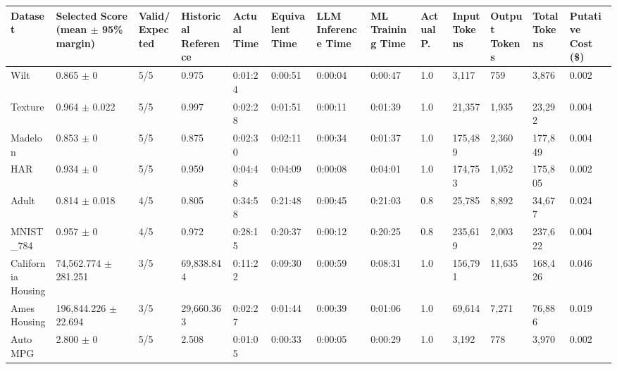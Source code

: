 \begin{tabular}{lllllllllllll}
\hline
Dataset & Selected Score (mean \ensuremath{\pm} 95\% margin) & Valid/Expected & Historical Reference & Actual Time & Equivalent Time & LLM Inference Time & ML Training Time & Actual P. & Input Tokens & Output Tokens & Total Tokens & Putative Cost (\$) \\
\hline
Wilt & 0.865 \ensuremath{\pm} 0 & 5/5 & 0.975 & 0:01:24 & 0:00:51 & 0:00:04 & 0:00:47 & 1.0 & 3,117 & 759 & 3,876 & 0.002 \\
Texture & 0.964 \ensuremath{\pm} 0.022 & 5/5 & 0.997 & 0:02:28 & 0:01:51 & 0:00:11 & 0:01:39 & 1.0 & 21,357 & 1,935 & 23,292 & 0.004 \\
Madelon & 0.853 \ensuremath{\pm} 0 & 5/5 & 0.875 & 0:02:30 & 0:02:11 & 0:00:34 & 0:01:37 & 1.0 & 175,489 & 2,360 & 177,849 & 0.004 \\
HAR & 0.934 \ensuremath{\pm} 0 & 5/5 & 0.959 & 0:04:48 & 0:04:09 & 0:00:08 & 0:04:01 & 1.0 & 174,753 & 1,052 & 175,805 & 0.002 \\
Adult & 0.814 \ensuremath{\pm} 0.018 & 4/5 & 0.805 & 0:34:58 & 0:21:48 & 0:00:45 & 0:21:03 & 0.8 & 25,785 & 8,892 & 34,677 & 0.024 \\
MNIST\_784 & 0.957 \ensuremath{\pm} 0 & 4/5 & 0.972 & 0:28:15 & 0:20:37 & 0:00:12 & 0:20:25 & 0.8 & 235,619 & 2,003 & 237,622 & 0.004 \\
California Housing & 74,562.774 \ensuremath{\pm} 281.251 & 3/5 & 69,838.844 & 0:11:22 & 0:09:30 & 0:00:59 & 0:08:31 & 1.0 & 156,791 & 11,635 & 168,426 & 0.046 \\
Ames Housing & 196,844.226 \ensuremath{\pm} 22.694 & 3/5 & 29,660.363 & 0:02:27 & 0:01:44 & 0:00:39 & 0:01:06 & 1.0 & 69,614 & 7,271 & 76,886 & 0.019 \\
Auto MPG & 2.800 \ensuremath{\pm} 0 & 5/5 & 2.508 & 0:01:05 & 0:00:33 & 0:00:05 & 0:00:29 & 1.0 & 3,192 & 778 & 3,970 & 0.002 \\
\hline
\end{tabular}
